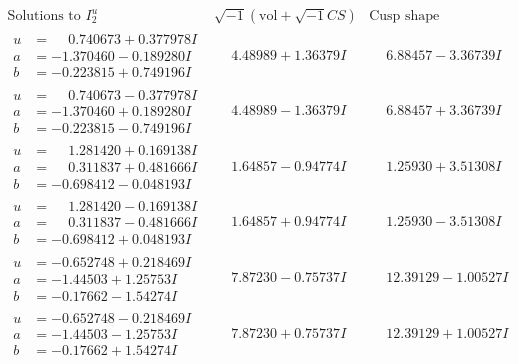 \documentclass[1p]{elsarticle_modified}
\theoremstyle{definition}
\newcommand{\I}{\sqrt{-1}}
\begin{document}
$$\begin{array}{c|c|c}  
\text{Solutions to }I^u_{2}& \I (\text{vol} + \sqrt{-1}CS) & \text{Cusp shape}\\
 \hline 
\begin{aligned}
u &= \phantom{-}0.740673 + 0.377978 I \\
a &= -1.370460 - 0.189280 I \\
b &= -0.223815 + 0.749196 I\end{aligned}
 & \phantom{-}4.48989 + 1.36379 I & \phantom{-}6.88457 - 3.36739 I \\ \hline\begin{aligned}
u &= \phantom{-}0.740673 - 0.377978 I \\
a &= -1.370460 + 0.189280 I \\
b &= -0.223815 - 0.749196 I\end{aligned}
 & \phantom{-}4.48989 - 1.36379 I & \phantom{-}6.88457 + 3.36739 I \\ \hline\begin{aligned}
u &= \phantom{-}1.281420 + 0.169138 I \\
a &= \phantom{-}0.311837 + 0.481666 I \\
b &= -0.698412 - 0.048193 I\end{aligned}
 & \phantom{-}1.64857 - 0.94774 I & \phantom{-}1.25930 + 3.51308 I \\ \hline\begin{aligned}
u &= \phantom{-}1.281420 - 0.169138 I \\
a &= \phantom{-}0.311837 - 0.481666 I \\
b &= -0.698412 + 0.048193 I\end{aligned}
 & \phantom{-}1.64857 + 0.94774 I & \phantom{-}1.25930 - 3.51308 I \\ \hline\begin{aligned}
u &= -0.652748 + 0.218469 I \\
a &= -1.44503 + 1.25753 I \\
b &= -0.17662 - 1.54274 I\end{aligned}
 & \phantom{-}7.87230 - 0.75737 I & \phantom{-}12.39129 - 1.00527 I \\ \hline\begin{aligned}
u &= -0.652748 - 0.218469 I \\
a &= -1.44503 - 1.25753 I \\
b &= -0.17662 + 1.54274 I\end{aligned}
 & \phantom{-}7.87230 + 0.75737 I & \phantom{-}12.39129 + 1.00527 I \\ \hline\begin{aligned}

\end{aligned}
\end{array}$$
\end{document}

